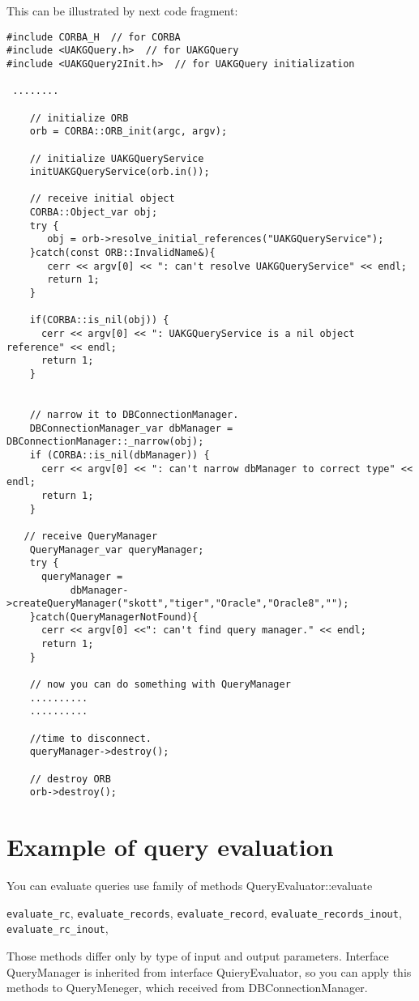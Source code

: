 \documentclass[10pt]{article}
\begin{document}
 This can be illustrated by next code fragment:
\begin{verbatim}
#include CORBA_H  // for CORBA
#include <UAKGQuery.h>  // for UAKGQuery
#include <UAKGQuery2Init.h>  // for UAKGQuery initialization

 ........

    // initialize ORB
    orb = CORBA::ORB_init(argc, argv);

    // initialize UAKGQueryService
    initUAKGQueryService(orb.in());

    // receive initial object
    CORBA::Object_var obj;
    try {
       obj = orb->resolve_initial_references("UAKGQueryService");
    }catch(const ORB::InvalidName&){
       cerr << argv[0] << ": can't resolve UAKGQueryService" << endl;
       return 1;
    }
        
    if(CORBA::is_nil(obj)) {
      cerr << argv[0] << ": UAKGQueryService is a nil object reference" << endl;
      return 1;
    }


    // narrow it to DBConnectionManager.
    DBConnectionManager_var dbManager = DBConnectionManager::_narrow(obj);
    if (CORBA::is_nil(dbManager)) {
      cerr << argv[0] << ": can't narrow dbManager to correct type" << endl;
      return 1;
    } 

   // receive QueryManager
    QueryManager_var queryManager;
    try {
      queryManager = 
           dbManager->createQueryManager("skott","tiger","Oracle","Oracle8","");
    }catch(QueryManagerNotFound){
      cerr << argv[0] <<": can't find query manager." << endl;
      return 1;
    }

    // now you can do something with QueryManager
    ..........
    ..........

    //time to disconnect.
    queryManager->destroy();

    // destroy ORB
    orb->destroy();

\end{verbatim}

\section{ Example of query evaluation }

 You can evaluate 
  queries use family of methods QueryEvaluator::evaluate 

    \verb|evaluate_rc|, \verb|evaluate_records|, 
    \verb|evaluate_record|, 
    \verb|evaluate_records_inout|, 
    \verb|evaluate_rc_inout|, 


 Those methods differ only by type of input and output parameters.
 Interface QueryManager is inherited from interface QuieryEvaluator, so you
 can apply this methods to QueryMeneger, which received from DBConnectionManager.
\end{document}
